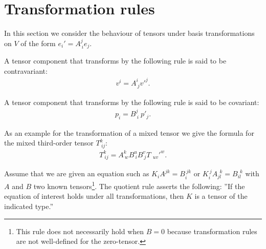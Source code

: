 
\section{Transformation rules}

    In this section we consider the behaviour of tensors under basis transformations on $V$ of the form $e_i' = A^j_{\ i}e_j$.

    \begin{definition}[Contravariant]\label{tensorcalculus:contravariant}
        A tensor component that transforms by the following rule is said to be contravariant:
        \begin{gather}
            v^i = A^i_{\ j}v'^j.
        \end{gather}
    \end{definition}

    \begin{definition}[Covariant]\label{tensorcalculus:covariant}
        A tensor component that transforms by the following rule is said to be covariant:
        \begin{gather}
            p_i = B^j_{\ i}\ p'_j.
        \end{gather}
    \end{definition}

    \begin{example}
        As an example for the transformation of a mixed tensor we give the formula for the mixed third-order tensor $T_{\ ij}^k$:
        \begin{gather}
            T_{\ ij}^k = A^k_{\ w}B^u_{\ i}B^v_{\ j}T_{\ \ uv}'^w.
        \end{gather}
    \end{example}

    \begin{method}
        Assume that we are given an equation such as $K_iA^{jk} = B_i^{\ jk}$ or $K_i^{\ j}A_{jl}^{\ \ k} = B_{il}^{\ \ k}$ with $A$ and $B$ two known tensors\footnote{This rule does not necessarily hold when $B = 0$ because transformation rules are not well-defined for the zero-tensor.}. The quotient rule asserts the following: ''If the equation of interest holds under all transformations, then $K$ is a tensor of the indicated type.''
    \end{method}

